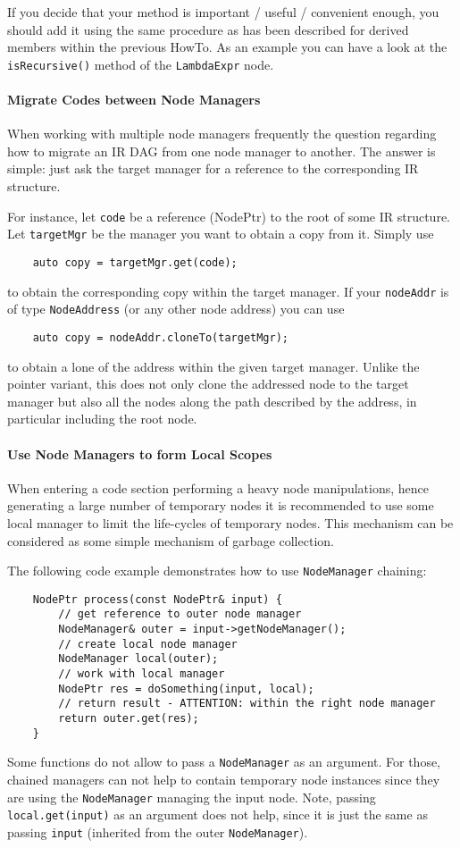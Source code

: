 If you decide that your method is important / useful / convenient enough, you
should add it using the same procedure as has been described for derived members
within the previous HowTo. As an example you can have a look at the
\lstinline|isRecursive()| method of the \lstinline|LambdaExpr| node.


\paragraph{Migrate Codes between Node Managers}
When working with multiple node managers frequently the question regarding how
to migrate an IR DAG from one node manager to another. The answer is simple:
just ask the target manager for a reference to the corresponding IR structure.

For instance, let \lstinline|code| be a reference (NodePtr) to the root of some
IR structure. Let \lstinline|targetMgr| be the manager you want to obtain a copy
from it. Simply use 
\begin{lstlisting}
	auto copy = targetMgr.get(code);
\end{lstlisting}
to obtain the corresponding copy within the target manager. If your
\lstinline|nodeAddr| is of type \lstinline|NodeAddress| (or any other node
address) you can use 
\begin{lstlisting}
	auto copy = nodeAddr.cloneTo(targetMgr);
\end{lstlisting}
to obtain a lone of the address within the given target manager. Unlike the
pointer variant, this does not only clone the addressed node to the target
manager but also all the nodes along the path described by the address,
in particular including the root node.

\paragraph{Use Node Managers to form Local Scopes}
When entering a code section performing a heavy node manipulations,
hence generating a large number of temporary nodes it is recommended to use some
local manager to limit the life-cycles of temporary nodes. This mechanism can be
considered as some simple mechanism of garbage collection.

The following code example demonstrates how to use \texttt{NodeManager} chaining:
\begin{lstlisting}
	NodePtr process(const NodePtr& input) {
		// get reference to outer node manager
		NodeManager& outer = input->getNodeManager();
		// create local node manager
		NodeManager local(outer);
		// work with local manager
		NodePtr res = doSomething(input, local);
		// return result - ATTENTION: within the right node manager
		return outer.get(res);
	}
\end{lstlisting}
Some functions do not allow to pass a \texttt{NodeManager} as an argument. For those,
chained managers can not help to contain temporary node instances since they are
using the \texttt{NodeManager} managing the input node. Note, passing
\lstinline|local.get(input)| as an argument does not help, since it is just the
same as passing \lstinline|input| (inherited from the outer \texttt{NodeManager}).

